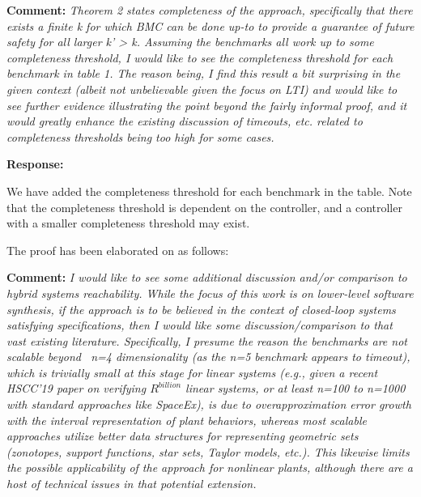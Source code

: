 \documentclass{article}
\begin{document}
\vspace{2em}
{\bf Comment: } {\itshape Theorem 2 states completeness of the approach, specifically that there exists a finite k for which BMC can be done up-to to
provide a guarantee of future safety for all larger k' > k. Assuming the benchmarks all work up to some completeness threshold, I would like to see
the completeness threshold for each benchmark in table 1. The reason being, I find this result a bit surprising in the given context (albeit not
unbelievable given the focus on LTI) and would like to see further evidence illustrating the point beyond the fairly informal proof, and it would
greatly enhance the existing discussion of timeouts, etc. related to completeness thresholds being too high for some cases.}

\vspace{1em}

{\bf Response: }

We have added the completeness threshold for each benchmark in the table. Note that the completeness threshold is dependent on the controller, 
and a controller with a smaller completeness threshold may exist. 

The proof has been elaborated on as follows:


\vspace{2em}

{\bf Comment: }
{\itshape I would like to see some additional discussion and/or comparison to hybrid systems reachability. While the focus of this work is on lower-level
software synthesis, if the approach is to be believed in the context of closed-loop systems satisfying specifications, then I would like some
discussion/comparison to that vast existing literature. Specifically, I presume the reason the benchmarks are not scalable beyond ~n=4 dimensionality
(as the n=5 benchmark appears to timeout), which is trivially small at this stage for linear systems (e.g., given a recent HSCC'19 paper on verifying
$R^{billion}$ linear systems, or at least n=100 to n=1000 with standard approaches like SpaceEx), is due to overapproximation error growth with the
interval representation of plant behaviors, whereas most scalable approaches utilize better data structures for representing geometric sets
(zonotopes, support functions, star sets, Taylor models, etc.). This likewise limits the possible applicability of the
approach for nonlinear plants, although there are a host of technical issues in that potential extension. }
\end{document}
